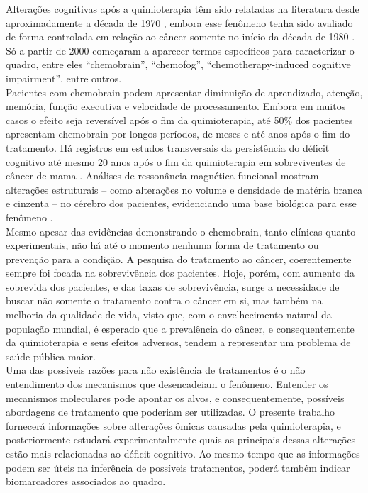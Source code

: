 \documentclass[12pt,a4paper]{article}
\begin{document}
Alterações cognitivas após a quimioterapia têm sido relatadas na literatura desde aproximadamente a década de 1970 \cite{Hinton1972,Levine1978, Meadows1976}, embora esse fenômeno tenha sido avaliado de forma controlada em relação ao câncer somente no início da década de 1980 \cite{Davis1987, Oxman1980, Silberfarb1980}. Só a partir de 2000 começaram a aparecer termos específicos para caracterizar o quadro, entre eles “chemobrain”, “chemofog”, “chemotherapy-induced cognitive impairment”, entre outros. \\
	
Pacientes com chemobrain podem apresentar diminuição de aprendizado, atenção, memória, função executiva e velocidade de processamento. Embora em muitos casos o efeito seja reversível após o fim da quimioterapia, até 50\% dos pacientes apresentam chemobrain por longos períodos, de meses e até anos após o fim do tratamento. Há registros em estudos transversais da persistência do déficit cognitivo até mesmo 20 anos após o fim da quimioterapia em sobreviventes de câncer de mama \cite{Ren2019, Ren2019a}. Análises de ressonância magnética funcional mostram alterações estruturais – como alterações no volume e densidade de matéria branca e cinzenta – no cérebro dos pacientes, evidenciando uma base biológica para esse fenômeno \cite{Rao2022}. \\
	
Mesmo apesar das evidências demonstrando o chemobrain, tanto clínicas quanto experimentais, não há até o momento nenhuma forma de tratamento ou prevenção para a condição. A pesquisa do tratamento ao câncer, coerentemente sempre foi focada na sobrevivência dos pacientes. Hoje, porém, com aumento da sobrevida dos pacientes, e das taxas de sobrevivência, surge a necessidade de buscar não somente o tratamento contra o câncer em si, mas também na melhoria da qualidade de vida, visto que, com o envelhecimento natural da população mundial, é esperado que a prevalência do câncer, e consequentemente da quimioterapia e seus efeitos adversos, tendem a representar um problema de saúde pública maior. \\
	
Uma das possíveis razões para não existência de tratamentos é o não entendimento dos mecanismos que desencadeiam o fenômeno. Entender os mecanismos moleculares pode apontar os alvos, e consequentemente, possíveis abordagens de tratamento que poderiam ser utilizadas. O presente trabalho fornecerá informações sobre alterações ômicas causadas pela quimioterapia, e posteriormente estudará experimentalmente quais as principais dessas alterações estão mais relacionadas ao déficit cognitivo. Ao mesmo tempo que as informações podem ser úteis na inferência de possíveis tratamentos, poderá também indicar biomarcadores associados ao quadro. \newpage
	
\end{document}
